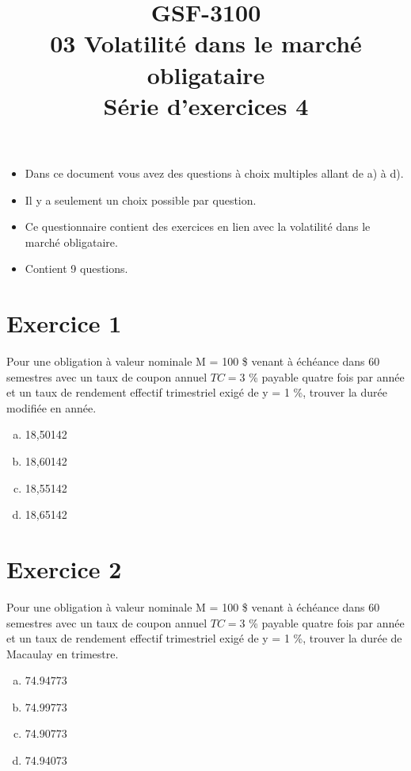 \documentclass[10pt,a4paper]{article}
\title{GSF-3100 \\
03 Volatilité dans le marché obligataire \\
Série d'exercices 4}
\begin{document}
\maketitle

\begin{itemize}
\item Dans ce document vous avez des questions à choix multiples allant de a) à d).  
\item Il y a seulement un choix possible par question.
\item Ce questionnaire contient des exercices en lien avec la volatilité dans le marché obligataire.
\item Contient 9 questions. 
\end{itemize}
 





\newpage

\section*{Exercice 1}
Pour une obligation à valeur nominale M = 100 \$ venant à échéance dans 60 semestres avec un taux de coupon annuel $TC= 3$ \% payable quatre fois par année et un taux de rendement effectif trimestriel exigé de y = 1 \%,  trouver la durée modifiée en année.


\begin{enumerate}[a)]
\item 18,50142 
\item 18,60142 
\item 18,55142 
\item 18,65142 
\end{enumerate}

\section*{Exercice 2}
Pour une obligation à valeur nominale M = 100 \$ venant à échéance dans 60 semestres avec un taux de coupon annuel $TC= 3$ \% payable quatre fois par année et un taux de rendement effectif trimestriel exigé de y = 1 \%,  trouver la durée de Macaulay en trimestre.


\begin{enumerate}[a)]
\item 74.94773 
\item 74.99773 
\item 74.90773 
\item 74.94073 
\end{enumerate}
\end{document}
